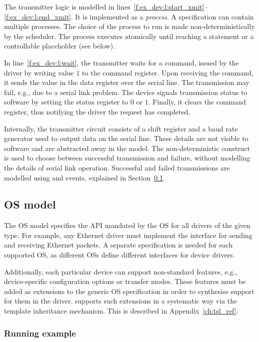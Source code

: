 The transmitter logic is modelled in lines~\ref{f:ex_dev:l:start_xmit}--\ref{f:ex_dev:l:end_xmit}.  It is implemented as a \tsl \emph{process}.  A \tsl specification can contain multiple processes.  The choice of the process to run is made non-deterministically by the scheduler.  The process executes atomically until reaching a  statement or a controllable placeholder (see below).

In line~\ref{f:ex_dev:l:wait}, the transmitter waits for a command, issued by the driver by writing value $1$ to the command register.  Upon receiving the command, it sends the value in the data register over the serial line.  The transmission may fail, e.g., due to a serial link problem.  The device signals transmission status to software by setting the status register to $0$ or $1$.  Finally, it clears the command register, thus notifying the driver the request has completed.

Internally, the transmitter circuit consists of a shift register and a baud rate generator used to output data on the serial line.  These details are not visible to software and are abstracted away in the model.  The non-deterministic  construct is used to choose between successful transmission and failure, without modelling the details of serial link operation.  Successful and failed transmissions are modelled using and  events, explained in Section~\ref{s:os}.

\subsection{OS model}\label{s:os}

The OS model specifies the API mandated by the OS for all drivers of the given type.  For example, any Ethernet driver must implement the interface for sending and receiving Ethernet packets.  A separate specification is needed for each supported OS, as different OSs define different interfaces for device drivers.

Additionally, each particular device can support non-standard features, e.g., device-specific configuration options or transfer modes.  These features must be added as extensions to the generic OS specification in order to synthesise support for them in the driver.  \tsl supports such extensions in a systematic way via the template inheritance mechanism.  This is described in Appendix~\ref{ch:tsl_ref}.

\subsubsection{Running example}

